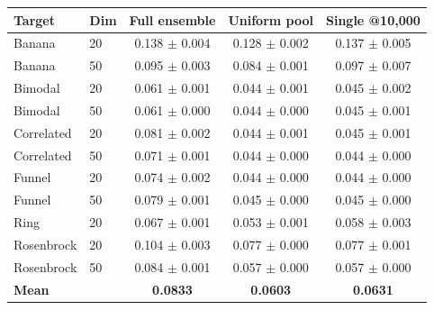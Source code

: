 \begin{tabular}{llccc}
\toprule
Target & Dim & Full ensemble & Uniform pool & Single @10{,}000 \\
\midrule
Banana & 20 & 0.138 $\pm$ 0.004 & 0.128 $\pm$ 0.002 & 0.137 $\pm$ 0.005 \\
Banana & 50 & 0.095 $\pm$ 0.003 & 0.084 $\pm$ 0.001 & 0.097 $\pm$ 0.007 \\
Bimodal & 20 & 0.061 $\pm$ 0.001 & 0.044 $\pm$ 0.001 & 0.045 $\pm$ 0.002 \\
Bimodal & 50 & 0.061 $\pm$ 0.000 & 0.044 $\pm$ 0.000 & 0.045 $\pm$ 0.001 \\
Correlated & 20 & 0.081 $\pm$ 0.002 & 0.044 $\pm$ 0.001 & 0.045 $\pm$ 0.001 \\
Correlated & 50 & 0.071 $\pm$ 0.001 & 0.044 $\pm$ 0.000 & 0.044 $\pm$ 0.000 \\
Funnel & 20 & 0.074 $\pm$ 0.002 & 0.044 $\pm$ 0.000 & 0.044 $\pm$ 0.000 \\
Funnel & 50 & 0.079 $\pm$ 0.001 & 0.045 $\pm$ 0.000 & 0.045 $\pm$ 0.000 \\
Ring & 20 & 0.067 $\pm$ 0.001 & 0.053 $\pm$ 0.001 & 0.058 $\pm$ 0.003 \\
Rosenbrock & 20 & 0.104 $\pm$ 0.003 & 0.077 $\pm$ 0.000 & 0.077 $\pm$ 0.001 \\
Rosenbrock & 50 & 0.084 $\pm$ 0.001 & 0.057 $\pm$ 0.000 & 0.057 $\pm$ 0.000 \\
\midrule
\textbf{Mean} & & \textbf{0.0833} & \textbf{0.0603} & \textbf{0.0631} \\
\bottomrule
\end{tabular}
